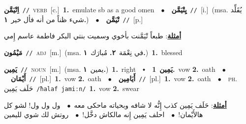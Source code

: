 \documentclass[10pt,a4paper,twoside]{article} %
\begin{document}
\begin{multicols}{2}
{{{{{{\setlength\topsep{0pt}\textbf{\foreignlanguage{arabic}{اِتْيَمَّن}}\ {\color{gray}\texttt{//}\color{black}}\ \textsc{verb}\ [c.]\ \textbf{1.}~emulate sb as a good omen\ \ $\bullet$\ \ \setlength\topsep{0pt}\textbf{\foreignlanguage{arabic}{يِتْيَمَّن}}\ {\color{gray}\texttt{//}\color{black}}\ [i.]\ \color{gray}(msa. \foreignlanguage{arabic}{يُقَلِّد شيء ظناً من أنه فأل خير}~\foreignlanguage{arabic}{\textbf{١.}})\color{black}\ \ $\bullet$\ \ \setlength\topsep{0pt}\textbf{\foreignlanguage{arabic}{تْيَمَّن}}\ {\color{gray}\texttt{//}\color{black}}\ [p.]\  \begin{flushright}\color{gray}\foreignlanguage{arabic}{\textbf{\underline{\foreignlanguage{arabic}{أمثلة}}}: طبعاً تْيَمَّنت بأخوي وسميت بنتي البكر فاطمة عاسم إِمي}\end{flushright}\color{black}} \vspace{2mm}

{\setlength\topsep{0pt}\textbf{\foreignlanguage{arabic}{مَيْمُون}}\ {\color{gray}\texttt{//}\color{black}}\ \textsc{adj}\ [m.]\ \color{gray}(msa. \foreignlanguage{arabic}{في نِعْمَة}~\foreignlanguage{arabic}{\textbf{٢.}}  \foreignlanguage{arabic}{مُبارَك}~\foreignlanguage{arabic}{\textbf{١.}})\color{black}\ \textbf{1.}~blessed\ 

{\setlength\topsep{0pt}\textbf{\foreignlanguage{arabic}{يَمِين}}\ {\color{gray}\texttt{//}\color{black}}\ \textsc{noun}\ [m.]\ \color{gray}(msa. \foreignlanguage{arabic}{يمين}~\foreignlanguage{arabic}{\textbf{١.}})\color{black}\ \textbf{1.}~right\ \ $\smblkdiamond$\ \ \setlength\topsep{0pt}\textbf{\foreignlanguage{arabic}{يَمِين}}\ \textbf{1.}~vow  \textbf{2.}~oath\ \ $\bullet$\ \ \setlength\topsep{0pt}\textbf{\foreignlanguage{arabic}{أَيْمَان}}\ {\color{gray}\texttt{//}\color{black}}\ [pl.]\ \textbf{1.}~vow  \textbf{2.}~oath\ \ $\bullet$\ \ \setlength\topsep{0pt}\textbf{\foreignlanguage{arabic}{أَيَامِين}}\ {\color{gray}\texttt{//}\color{black}}\ [pl.]\ \textbf{1.}~vow  \textbf{2.}~oath\ \ $\bullet$\ \ \textsc{ph.} \color{gray} \foreignlanguage{arabic}{حَلَف يَمِين}\color{black}\ {\color{gray}\texttt{/{\sffamily ħalaf jamiːn}/}\color{black}}\ \textbf{1.}~vow  \textbf{2.}~swear\  \begin{flushright}\color{gray}\foreignlanguage{arabic}{\textbf{\underline{\foreignlanguage{arabic}{أمثلة}}}: حَلَف يَمِين كذب إِنُّه لا شافه وبحياته ماحكى معه\ $\bullet$\ \  ول ول ول! لشو كل هالأَيْمان!\ $\bullet$\ \  احلف يَمِين إِنه مالكاش دخَّل!\ $\bullet$\ \  روتش لك شوي لليمين}\end{flushright}\color{black}} \vspace{2mm}

}}}}}}
\end{multicols}
\end{document}
